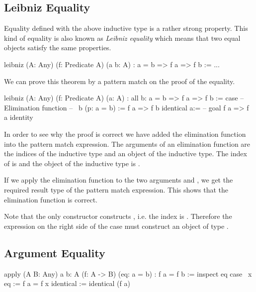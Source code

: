\subsection{Leibniz Equality}

Equality defined with the above inductive type is a rather strong
property. This kind of equality is also known as \emph{Leibniz equality} which
means that two equal objects satisfy the same properties.
%
\begin{alba}
    leibniz
        (A: Any)
        (f: Predicate A)
        (a b: A)
        : a = b => f a => f b
    :=
        ...
\end{alba}


We can prove this theorem by a pattern match on the proof of the equality.

\begin{alba}
    leibniz
        (A: Any)
        (f: Predicate A)
        (a: A)
        : all b: a = b => f a => f b
    :=
        case
            -- Elimination function
            -- \ b (p: a = b) := f a => f b
            identical a:=
                -- goal f a => f a
                identity
\end{alba}


In order to see why the proof is correct we have added the elimination function
into the pattern match expression. The arguments of an elimination function are
the indices of the inductive type and an object of the inductive type. The index
of  is  and the object of the inductive type is .

If we apply the elimination function to the two arguments  and
, we get the required result type  of the pattern
match expression. This shows that the elimination function is correct.

Note that the only constructor  constructs , i.e.
the index is . Therefore the expression on the right side of the case
must construct an object of type .



\subsection{Argument Equality}

\begin{alba}
    apply
        (A B: Any) {a b: A}
        (f: A -> B)
        (eq: a = b)
        : f a = f b
    :=
        inspect eq case
            {\ x eq := f a = f x}
            identical := identical (f a)
\end{alba}


